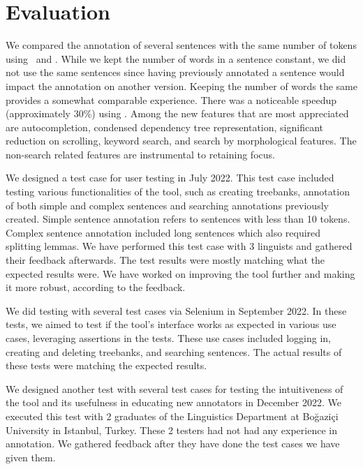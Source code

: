 \section{Evaluation}
\label{sec:evaluation}

We compared the annotation of several sentences with the same number of tokens using \boatvone\ and \boatvtwo.
While we kept the number of words in a sentence constant, we did not use the same sentences since having previously annotated a sentence would impact the annotation on another version.
Keeping the number of words the same provides a somewhat comparable experience.
There was a noticeable speedup (approximately 30\%) using \boatvtwo.
Among the new features that are most appreciated are autocompletion, condensed dependency tree representation, significant reduction on scrolling, keyword search, and search by morphological features.
The non-search related features are instrumental to retaining focus.

We designed a test case for user testing in July 2022.
This test case included testing various functionalities of the tool, such as creating treebanks, annotation of both simple and complex sentences and searching annotations previously created.
Simple sentence annotation refers to sentences with less than 10 tokens.
Complex sentence annotation included long sentences which also required splitting lemmas.
We have performed this test case with 3 linguists and gathered their feedback afterwards.
The test results were mostly matching what the expected results were.
We have worked on improving the tool further and making it more robust, according to the feedback.

We did testing with several test cases via Selenium in September 2022.
In these tests, we aimed to test if the tool's interface works as expected in various use cases, leveraging assertions in the tests.
These use cases included logging in, creating and deleting treebanks, and searching sentences.
The actual results of these tests were matching the expected results.

We designed another test with several test cases for testing the intuitiveness of the tool and its usefulness in educating new annotators in December 2022.
We executed this test with 2 graduates of the Linguistics Department at Boğaziçi University in Istanbul, Turkey.
These 2 testers had not had any experience in annotation.
We gathered feedback after they have done the test cases we have given them.

